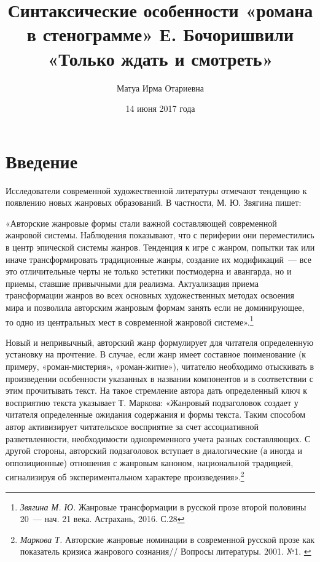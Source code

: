 \documentclass{kursa4}
\title{Синтаксические особенности «романа в стенограмме» Е. Бочоришвили «Только
ждать и смотреть»}
\author{Матуа Ирма Отариевна}
\date{14 июня 2017 года}
\begin{document}
  \pagestyle{empty}

  \maketitle


  \setcounter{tocdepth}{2}
  \renewcommand\contentsname{}
  \tableofcontents

  \pagestyle{plain}

  \chapter{Введение}

    Исследователи современной художественной литературы отмечают
    тенденцию к появлению новых жанровых образований. В частности, М. Ю.
    Звягина пишет:

    «Авторские жанровые формы стали важной составляющей современной
    жанровой системы. Наблюдения показывают, что с периферии они
    переместились в центр эпической системы жанров. Тенденция к игре с
    жанром, попытки так или иначе трансформировать традиционные жанры,
    создание их модификаций~--- все это отличительные черты не только
    эстетики постмодерна и авангарда, но и приемы, ставшие привычными для
    реализма. Актуализация приема трансформации жанров во всех основных
    художественных методах освоения мира и позволила авторским жанровым
    формам занять если не доминирующее, то одно из центральных мест в
    современной жанровой
    системе».\footnote{\textit{{Звягина М. Ю.
    }}{Жанровые трансформации в русской прозе второй
    половины 20~--- нач. 21 века. Астрахань, 2016. С.28}}

    Новый и непривычный, авторский жанр формулирует для читателя
    определенную установку на прочтение. В случае, если жанр имеет
    составное поименование (к примеру, «роман-мистерия», «роман-житие»),
    читателю необходимо отыскивать в произведении особенности указанных в
    названии компонентов и в соответствии с этим прочитывать текст. На
    такое стремление автора дать определенный ключ к восприятию текста
    указывает Т. Маркова:\newline
    «Жанровый подзаголовок создает у читателя определенные ожидания
    содержания и формы текста. Таким способом автор активизирует
    читательское восприятие за счет ассоциативной разветвленности,
    необходимости одновременного учета разных составляющих. С другой
    стороны, авторский подзаголовок вступает в диалогические (а иногда и
    оппозиционные) отношения с жанровым каноном, национальной традицией,
    сигнализируя об экспериментальном характере
    произведения».\footnote{{
    }\textit{{Маркова Т. }}{Авторские
    жанровые номинации в современной русской прозе как показатель кризиса
    жанрового сознания// Вопросы литературы. 2001. №1. }}
\end{document}
